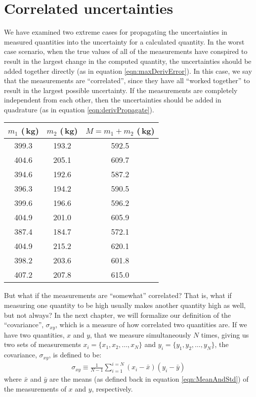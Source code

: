 \section{Correlated uncertainties}
\label{sec:corrMeas}
We have examined two extreme cases for propagating the uncertainties in measured quantities into the uncertainty for a calculated quantity. In the worst case scenario, when the true values of all of the measurements have conspired to result in the largest change in the computed quantity, the uncertainties should be added together directly (as in equation \ref{eqn:maxDerivError}). In this case, we say that the measurements are ``correlated'', since they have all ``worked together'' to result in the largest possible uncertainty. If the measurements are completely independent from each other, then the uncertainties should be added in quadrature (as in equation \ref{eqn:derivPropagate}).
\begin{center}
\begin{tabular}{ |c|c|c| }
  \hline
  \textbf{$m_1$ (\,kg)} & \textbf{$m_2$ (\,kg)} & \textbf{$M=m_1+m_2$ (\,kg)}\\
  \hline
  399.3 & 193.2& 592.5 \\ 
  \hline
  404.6 & 205.1& 609.7 \\ 
  \hline
  394.6 & 192.6& 587.2 \\ 
  \hline
  396.3 & 194.2& 590.5 \\ 
  \hline
  399.6 & 196.6& 596.2 \\ 
  \hline
  404.9 & 201.0& 605.9 \\ 
  \hline
  387.4 & 184.7& 572.1 \\ 
  \hline
  404.9 & 215.2& 620.1 \\ 
  \hline
  398.2 & 203.6& 601.8 \\ 
  \hline
  407.2 & 207.8& 615.0 \\ 
  \hline
\end{tabular}
\end{center}
But what if the measurements are ``somewhat'' correlated? That is, what if measuring one quantity to be high usually makes another quantity high as well, but not always? In the next chapter, we will formalize our definition of the ``covariance'', $\sigma_{xy}$, which is a measure of how correlated two quantities are. If we have two quantities, $x$ and $y$, that we measure simultaneously $N$ times, giving us two sets of measurements  $x_i=\{x_1, x_2,\dots, x_N\}$ and $y_i=\{y_1, y_2,\dots, y_N\}$, the covariance, $\sigma_{xy}$, is defined to be:
\begin{align}
\sigma_{xy}\equiv\frac{1}{N-1}\sum_{i=1}^{i=N}(x_i-\bar x)(y_i-\bar y)
\end{align}
where $\bar x$ and $\bar y$ are the means (as defined back in equation \ref{eqn:MeanAndStd}) of the measurements of $x$ and $y$, respectively.


